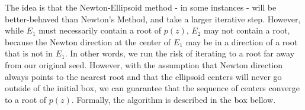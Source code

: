 \documentclass{article}
\begin{document}
The idea is that the Newton-Ellipsoid method - in some instances - will be better-behaved than Newton's Method, and take a larger iterative step. However, while $E_1$ must necessarily contain a root of $p(z)$, $E_2$ may not contain a root, because the Newton direction at the center of $E_1$ may be in a direction of a root that is not in $E_1$. In other words, we run the risk of iterating to a root far away from our original seed. However, with the assumption that Newton direction always points to the nearest root and that the ellipsoid centers will never go outside of the initial box, we can guarantee that the sequence of centers converge to a root of $p(z)$. Formally, the algorithm is described in the box bellow.


\begin{center}
\end{center}
\end{document}
